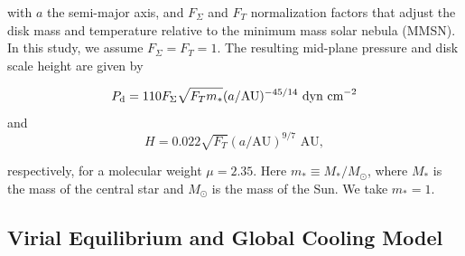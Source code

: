 \documentclass[apj]{emulateapj}
\newcommand{\di}{_{\rm d}}
\begin{document}
\noindent with $a$ the semi-major axis, and $F_{\Sigma}$ and $F_T$ normalization factors that adjust the disk mass and temperature relative to the minimum mass solar nebula (MMSN). In this study, we assume $F_{\Sigma}=F_T=1$. The resulting mid-plane pressure and disk scale height are given by 

\begin{equation}
\label{eq:Pd}
P\di=110  F_{\Sigma} \sqrt{F_T m_*} (a/\text{AU})^{-45/14} \,\, \text{dyn cm}^{-2}
\end{equation}
and
\begin{equation}
H=0.022 \sqrt{F_T} (a/\text{AU})^{9/7}\,\, \text{AU},
\end{equation}

\noindent respectively, for a molecular weight $\mu=2.35$. Here $m_* \equiv M_*/M_{\odot}$, where $M_*$ is the mass of the central star and $M_{\odot}$ is the mass of the Sun. We take $m_*=1$. 





\subsection{Virial Equilibrium and Global Cooling Model}
\label{cooling}
\end{document}
